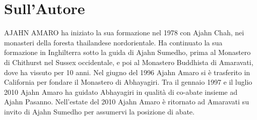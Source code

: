 \chapter{Sull'Autore}

{\firaSansLightFont AJAHN AMARO} ha iniziato la sua formazione nel 1978 con
Ajahn Chah, nei monasteri della foresta thailandese nordorientale. Ha continuato
la sua formazione in Inghilterra sotto la guida di Ajahn Sumedho, prima al
Monastero di Chithurst nel Sussex occidentale, e poi al Monastero Buddhista di
Amaravati, dove ha vissuto per 10 anni. Nel giugno del 1996 Ajahn Amaro si è
trasferito in California per fondare il Monastero di Abhayagiri. Tra il gennaio
1997 e il luglio 2010 Ajahn Amaro ha guidato Abhayagiri in qualità di co-abate
insieme ad Ajahn Pasanno. Nell'estate del 2010 Ajahn Amaro è ritornato ad
Amaravati su invito di Ajahn Sumedho per assumervi la posizione di abate.
